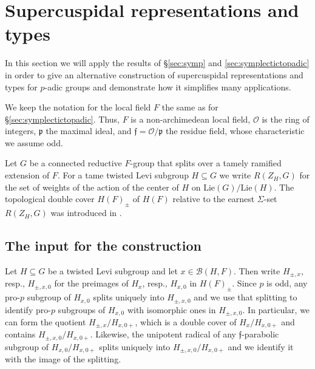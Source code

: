 \documentclass{article}
\def\mf#1{\mathfrak{#1}}
\def\cO{\mathcal{O}}
\newcommand{\cB}{\mathcal{B}}
\theoremstyle{definition}
\numberwithin{equation}{subsection}
\renewcommand{\-}{\hyp{}}
\newcommand{\rf}{\mathfrak{f}}
\begin{document}
\section{Supercuspidal representations and types} \label{sec:supercuspidal}

In this section we will apply the results of \S\ref{sec:symp} and \ref{sec:symplectictopadic} in order to give an alternative construction of supercuspidal representations and types for $p$-adic groups and demonstrate how it simplifies many applications.

We keep the notation for the local field $F$ the same as for \S\ref{sec:symplectictopadic}. Thus, $F$ is a non-archimedean local field, $\cO$ is the ring of integers, $\mf{p}$ the maximal ideal, and $\rf=\cO/\mf{p}$ the residue field, whose characteristic we assume odd.

Let $G$ be a connected reductive $F$-group that splits over a tamely ramified extension of $F$. For a tame twisted Levi subgroup $H \subseteq G$ we write $R(Z_H,G)$ for the set of weights of the action of the center of $H$ on $\mathrm{Lie}(G)/\mathrm{Lie}(H)$. The topological double cover $H(F)_\pm$ of $H(F)$ relative to the earnest $\Sigma$-set $R(Z_H,G)$ was introduced in \cite[\S6.1]{KalDC}.

\subsection{The input for the construction}\label{sub:input}

Let $H\subseteq G$ be a twisted Levi subgroup and let $x \in \cB(H,F)$. Then write $H_{\pm,x}$, resp., $H_{\pm,x,0}$ for the preimages of $H_x$, resp., $H_{x,0}$ in $H(F)_\pm$. Since $p$ is odd, any pro-$p$ subgroup of $H_{x,0}$ splits uniquely into $H_{\pm,x,0}$ and we use that splitting to identify pro-$p$ subgroups of $H_{x,0}$ with isomorphic ones in $H_{\pm, x,0}$. In particular, we can form the quotient $H_{\pm, x}/H_{x,0+}$, which is a double cover of $H_x/H_{x,0+}$ and contains $H_{\pm,x,0}/H_{x,0+}$. Likewise, the unipotent radical of any $\rf$-parabolic subgroup of $H_{x,0}/H_{x,0+}$ splits uniquely into $H_{\pm, x,0}/H_{x,0+}$ and we identify it with the image of the splitting.
\end{document}
